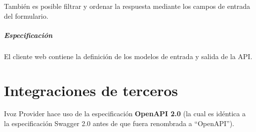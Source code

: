 \documentclass[letterpaper,10pt,spanish]{sphinxmanual}
\begin{document}

También es posible filtrar y ordenar la respuesta mediante los campos de entrada del formulario.
\paragraph{Especificación}

El cliente web contiene la definición de los modelos de entrada y salida de la API.



\chapter{Integraciones de terceros}
\label{api_rest/integrations:third-party-integrations}\label{api_rest/integrations::doc}
Ivoz Provider hace uso de la especificación \textbf{OpenAPI 2.0} (la cual es idéntica a la especificación Swagger 2.0 antes de que fuera renombrada a ``OpenAPI'').
\end{document}
